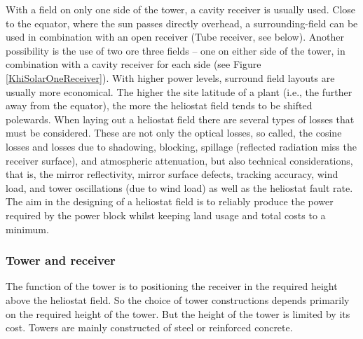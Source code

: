 With a field on only one side of the tower, a cavity receiver is usually used. Close to the equator, where the sun passes directly overhead, a surrounding-field can be used in combination with an open receiver (Tube receiver, see below). Another possibility is the use of two ore three fields – one on either side of the tower, in combination with a cavity receiver for each side (see Figure \ref{KhiSolarOneReceiver}). With higher power levels, surround field layouts are usually more economical. The higher the site latitude of a plant (i.e., the further away from the equator), the more the heliostat field tends to be shifted polewards. When laying out a heliostat field there are several types of losses that must be considered. These are not only the optical losses, so called, the cosine losses and losses due to shadowing, blocking, spillage (reflected radiation miss the receiver surface), and atmospheric attenuation, but also technical considerations, that is, the mirror reflectivity, mirror surface defects, tracking accuracy, wind load, and tower oscillations (due to wind load) as well as the heliostat fault rate. The aim in the designing of a heliostat field is to reliably produce the power required by the power block whilst keeping land usage and total costs to a minimum. \cite{Vant-Hull2012} \pagebreak
\subsubsection{Tower and receiver}
The function of the tower is to positioning the receiver in the required height above the heliostat field. So the choice of tower constructions depends primarily on the required height of the tower. But the height of the tower is limited by its cost. Towers are mainly constructed of steel or reinforced concrete. 



